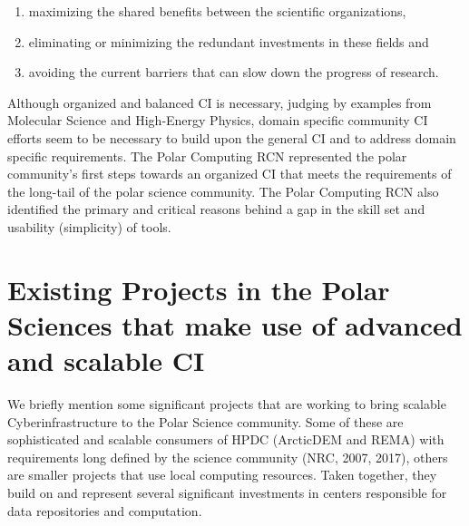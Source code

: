 \documentclass[10pt,letterpaper,draft]{article}
\begin{document}
\begin{enumerate}[label=\roman*., itemsep=0pt, topsep=0pt]

\item maximizing the shared benefits between the scientific organizations,
\item eliminating or minimizing the redundant investments in these fields and
\item avoiding the current barriers that can slow down the progress of research.
\end{enumerate}
Although organized and balanced CI is necessary, judging by examples from Molecular Science and High-Energy Physics, domain specific community CI efforts seem to be necessary to build upon the general CI and to address domain specific requirements. The Polar Computing RCN represented the polar community's first steps towards an organized CI that meets the requirements of the long-tail of the polar science community. The Polar Computing RCN also identified the primary and critical reasons behind a gap in the skill set and usability (simplicity) of tools.


\section*{Existing Projects in the Polar Sciences that make use of advanced and scalable CI}

We briefly mention some significant projects that are working to bring scalable Cyberinfrastructure to the Polar Science community. Some of these are sophisticated and scalable consumers of HPDC (ArcticDEM and REMA) with requirements long defined by the science community (NRC, 2007, 2017), others are smaller projects that use local computing resources. Taken together, they build on and represent several significant investments in centers responsible for data repositories and computation.
\end{document}
